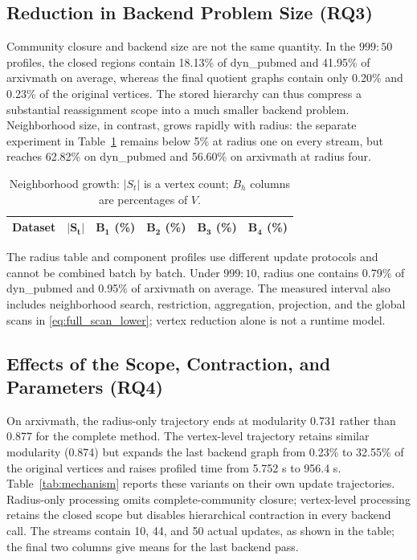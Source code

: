 \documentclass{ieeeaccess}
\begin{document}
\subsection{Reduction in Backend Problem Size (RQ3)}

Community closure and backend size are not the same quantity. In the
$999{:}50$ profiles, the closed regions contain 18.13\% of dyn\_pubmed and
41.95\% of arxivmath on average, whereas the final quotient graphs contain
only 0.20\% and 0.23\% of the original vertices. The stored hierarchy can thus
compress a substantial reassignment scope into a much smaller backend problem.
Neighborhood size, in contrast, grows rapidly with radius: the separate
experiment in Table~\ref{tab:neighborhood} remains below 5\% at radius one on
every stream, but reaches 62.82\% on dyn\_pubmed and 56.60\% on arxivmath at
radius four.

\begin{table}[t]
\centering
\caption{Neighborhood growth: $|S_t|$ is a vertex count; $B_h$ columns are
percentages of $V$.}
\label{tab:neighborhood}
\setlength{\tabcolsep}{2.8pt}
\scriptsize
\begin{tabular}{@{}lrrrrr@{}}
\toprule
\textbf{Dataset} & $\bm{|S_t|}$ & $\bm{B_1}$ \textbf{(\%)} &
$\bm{B_2}$ \textbf{(\%)} & $\bm{B_3}$ \textbf{(\%)} &
$\bm{B_4}$ \textbf{(\%)} \\
\midrule

\end{tabular}
\end{table}

The radius table and component profiles use different update protocols and
cannot be combined batch by batch. Under $999{:}10$, radius one contains
0.79\% of dyn\_pubmed and 0.95\% of arxivmath on average. The measured interval also
includes neighborhood search, restriction, aggregation, projection, and the
global scans in \eqref{eq:full_scan_lower}; vertex reduction alone is not a
runtime model.

\subsection{Effects of the Scope, Contraction, and Parameters (RQ4)}

On arxivmath, the radius-only trajectory ends at modularity 0.731 rather than
0.877 for the complete method. The vertex-level trajectory retains similar
modularity (0.874) but expands the last backend graph from 0.23\% to 32.55\%
of the original vertices and raises profiled time from 5.752 s to 956.4 s.
Table~\ref{tab:mechanism} reports these variants on their own update
trajectories. Radius-only processing omits complete-community closure;
vertex-level processing retains the closed scope but disables hierarchical
contraction in every backend call. The streams contain 10, 44, and 50 actual
updates, as shown in the table; the final two columns give means for the last
backend pass.
\end{document}
